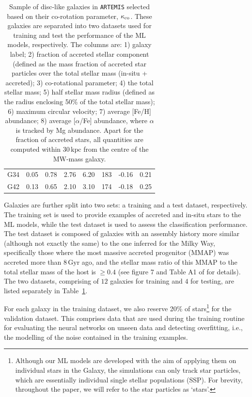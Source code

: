 \begin{table}
\begin{center}
\begin{tabular}[H]{| c c c c c c c c |}
    G34 & 0.05 & 0.78 & 2.76 & 6.20 & 183 & -0.16 & 0.21 \\

    G42 & 0.13 & 0.65 & 2.10 & 3.10 & 174 & -0.18 & 0.25 \\
    \hline
\end{tabular}
\end{center}
    \caption{Sample of disc-like galaxies in \texttt{ARTEMIS} selected based on their co-rotation parameter, $\kappa_{\rm co}$. These galaxies are separated into two datasets used for training and test the performance of the ML models, respectively. The columns are: 1) galaxy label; 2) fraction of accreted stellar component (defined as the mass fraction of accreted star particles over the total stellar mass (in-situ + accreted); 3) co-rotational parameter; 4) the total stellar mass; 5) half stellar mass radius (defined as the radius enclosing 50\% of the total stellar mass); 6) maximum circular velocity; 7) average [Fe/H] abundance; 8) average [$\alpha$/Fe] abundance, where $\alpha$ is tracked by Mg abundance. Apart for the fraction of accreted stars, all quantities are computed within $30 \, \mathrm{kpc}$ from the centre of the MW-mass galaxy.}
    \label{tab:datasets}
\end{table}


Galaxies are further split into two sets: a training and a test dataset, respectively. The training set is used to provide examples of accreted and in-situ stars to the ML models, while the test dataset is used to assess the classification performance. The test dataset is composed of galaxies with an assembly history more similar (although not exactly the same) to the one inferred for the Milky Way, specifically those where the most massive accreted progenitor (MMAP) was accreted more than $8 \, \textrm{Gyr}$ ago, and the stellar mass ratio of this MMAP to the total stellar mass of the host is $\geq 0.4$ (see figure 7 and Table A1 of \citealt{Dillamore2022} for details). The two datasets, comprising of $12$ galaxies for training and $4$ for testing, are listed separately in Table~\ref{tab:datasets}.

For each galaxy in the training dataset, we also reserve 20\% of stars\footnote{Although our ML models are developed with the aim of applying them on individual stars in the Galaxy, the simulations can only track star particles, which are essentially individual single stellar populations (SSP). For brevity, throughout the paper, we will refer to the star particles as `stars'.} for the validation dataset. This comprises data that are used during the training routine for evaluating the neural networks on unseen data and detecting overfitting, i.e., the modelling of the noise contained in the training examples.

